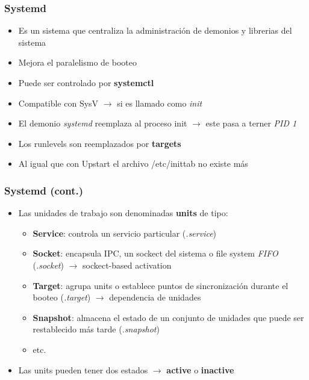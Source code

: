 \begin{frame}
  	\frametitle{\textbf{Systemd}}
  	\begin{itemize}
		\item Es un sistema que centraliza la administración de demonios y librerias del sistema
		\item Mejora el paralelismo de booteo
		\item Puede ser controlado por \textbf{systemctl}
		\item Compatible con SysV $\rightarrow$ si es llamado como \emph{init}
		\item El demonio \emph{systemd} reemplaza al proceso init $\rightarrow$ este pasa a terner \emph{PID 1}
		\item Los runlevels son reemplazados por \textbf{targets}
		\item Al igual que con Upstart el archivo /etc/inittab no existe más
  	\end{itemize}
\end{frame}

\begin{frame}
  	\frametitle{\textbf{Systemd} (cont.)}
  	\begin{itemize}
		\item Las unidades de trabajo son denominadas \textbf{units} de tipo:
		\begin{itemize}
			\item \textbf{Service}: controla un servicio particular (\emph{.service})
			\item \textbf{Socket}: encapsula IPC, un sockect del sistema o file system \emph{FIFO} (\emph{.socket}) $\rightarrow$ sockect-based activation
			\item \textbf{Target}: agrupa units o establece puntos de sincronización durante el booteo (\emph{.target}) $\rightarrow$ dependencia de unidades
			\item \textbf{Snapshot}: almacena el estado de un conjunto de unidades que puede ser restablecido más tarde (\emph{.snapshot})
			\item etc.
		\end{itemize}
		\item Las units pueden tener dos estados $\rightarrow$ \textbf{active} o \textbf{inactive}
  	\end{itemize}
\end{frame}

